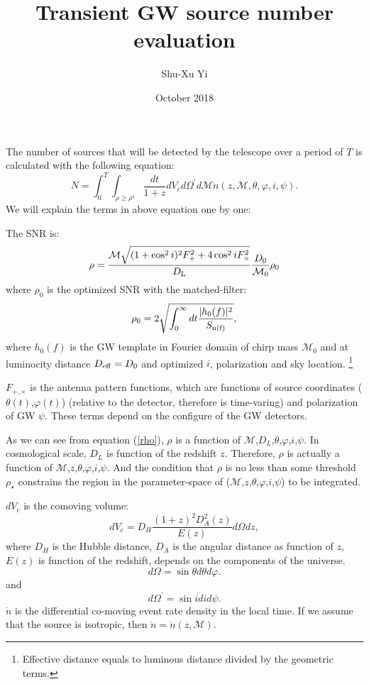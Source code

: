\documentclass{article}
\title{Transient GW source number evaluation}
\author{Shu-Xu Yi}
\date{October 2018}
\begin{document}
\maketitle
The number of sources that will be detected by the telescope over a period of $T$ is calculated with the following equation:
\begin{equation}
    N=\int^T_0\int_{\rho\ge\rho^\star}\frac{dt}{1+z}dV_cd\Omega^\prime d\mathcal{M}\dot{n}(z,\mathcal{M},\theta,\varphi,i,\psi).
\end{equation}
We will explain the terms in above equation one by one:

The SNR is:
\begin{equation}
    \rho=\frac{\mathcal{M}{\sqrt{(1+\cos^2i)^2F^2_++4\cos^2i F^2_\times}}}{D_{\rm{L}}}\frac{D_0}{\mathcal{M}_0}\rho_0
    \label{rho}
\end{equation}
where $\rho_0$ is the optimized SNR with the matched-filter:
\begin{equation}
    \rho_0=2\sqrt{\int^\infty_0dt\frac{|h_0(f)|^2}{S_{\rm{n}(f)}}},
\end{equation}
where $h_0(f)$ is the GW template in Fourier domain of chirp mass $\mathcal{M}_0$ and at luminocity distance $D_{\rm{eff}}=D_0$ and optimized $i$, polarization and sky location. \footnote{Effective distance equals to luminous distance divided by the geometric terms.}

$F_{+,\times}$ is the antenna pattern functions, which are functions of source coordinates ($\theta(t)$,$\varphi(t)$) (relative to the detector, therefore is time-varing) and polarization of GW $\psi$. These terms depend on the configure of the GW detectors. 

As we can see from equation (\ref{rho}), $\rho$ is a function of $\mathcal{M}$,$D_L$,$\theta$,$\varphi$,$i$,$\psi$. In cosmological scale, $D_L$ is function of the redshift $z$. Therefore, $\rho$ is actually a function of $\mathcal{M}$,$z$,$\theta$,$\varphi$,$i$,$\psi$. And the condition that $\rho$ is no less than some threshold $\rho_\star$ constrains the region in the parameter-space of ($\mathcal{M}$,$z$,$\theta$,$\varphi$,$i$,$\psi$) to be integrated. 

$dV_c$ is the comoving volume:
\begin{equation}
    dV_c=D_H\frac{(1+z)^2D^2_A(z)}{E(z)}d\Omega dz,
\end{equation}
where 
$D_H$ is the Hubble distance, $D_A$ is the angular distance as function of $z$, $E(z)$ is function of the redshift, depends on the components of the universe. 
\begin{equation}
    d\Omega=\sin\theta d\theta d\varphi. 
\end{equation}
and 
\begin{equation}
    d\Omega^\prime=\sin idid\psi. 
\end{equation}
$\dot{n}$ is the differential co-moving event rate density in the local time. If we assume that the source is isotropic, then $\dot{n}=\dot{n}(z,\mathcal{M})$. 
\end{document}
